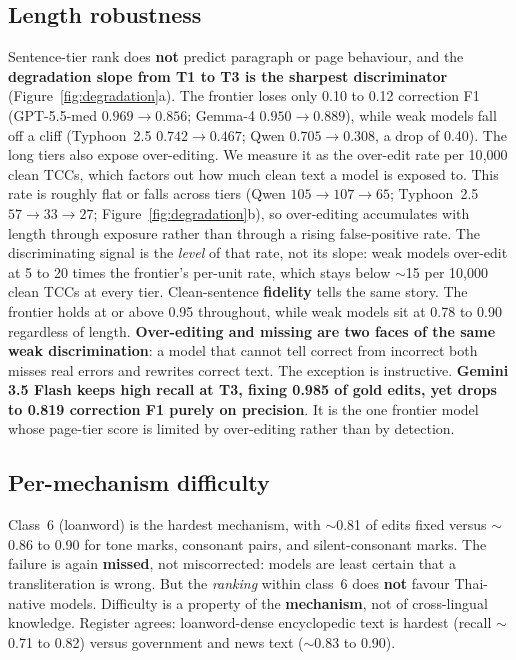 \documentclass[11pt]{article}
\begin{document}
\subsection{Length robustness}
\label{sec:length}
Sentence-tier rank does \textbf{not} predict paragraph or page behaviour, and the
\textbf{degradation slope from T1 to T3 is the sharpest discriminator}
(Figure~\ref{fig:degradation}a). The frontier loses only 0.10 to 0.12 correction F1
(GPT-5.5-med $0.969{\to}0.856$; Gemma-4 $0.950{\to}0.889$), while weak models fall off a cliff
(Typhoon~2.5 $0.742{\to}0.467$; Qwen $0.705{\to}\mathbf{0.308}$, a drop of 0.40). The long
tiers also expose over-editing. We measure it as the over-edit rate per 10{,}000 clean TCCs,
which factors out how much clean text a model is exposed to. This rate is roughly flat or falls
across tiers (Qwen $105{\to}107{\to}65$; Typhoon~2.5 $57{\to}33{\to}27$;
Figure~\ref{fig:degradation}b), so over-editing accumulates with length through exposure rather
than through a rising false-positive rate. The discriminating signal is the \emph{level} of that
rate, not its slope: weak models over-edit at 5 to 20 times the frontier's per-unit rate, which
stays below $\sim$15 per 10{,}000 clean TCCs at every tier. Clean-sentence
\textbf{fidelity} tells the same story. The frontier holds at or above 0.95 throughout, while
weak models sit at 0.78 to 0.90 regardless of length. \textbf{Over-editing and missing are two
faces of the same weak discrimination}: a model that cannot tell correct from incorrect both
misses real errors and rewrites correct text. The exception is instructive. \textbf{Gemini 3.5
Flash keeps high recall at T3, fixing 0.985 of gold edits, yet drops to 0.819 correction F1
purely on precision}. It is the one frontier model whose page-tier score is limited by
over-editing rather than by detection.

\subsection{Per-mechanism difficulty}
Class~6 (loanword) is the hardest mechanism, with $\sim$0.81 of edits fixed versus $\sim$0.86
to 0.90 for tone marks, consonant pairs, and silent-consonant marks. The failure is again
\textbf{missed}, not miscorrected: models are least certain that a transliteration is wrong.
But the \emph{ranking} within class~6 does \textbf{not} favour Thai-native models. Difficulty
is a property of the \textbf{mechanism}, not of cross-lingual knowledge. Register agrees:
loanword-dense encyclopedic text is hardest (recall $\sim$0.71 to 0.82) versus government and
news text ($\sim$0.83 to 0.90).
\end{document}
